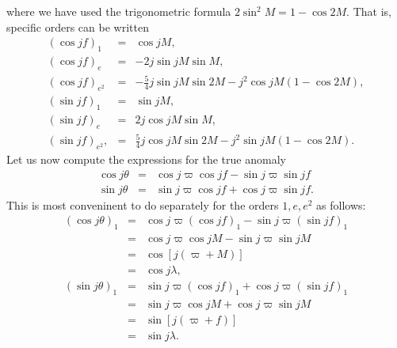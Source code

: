 \documentclass [12pt, a4paper] {article}
\begin{document}
where we have used the trigonometric formula $2\sin^2 M = 1 - \cos 2M$.
That is, specific orders can be written 
\begin {eqnarray}
    (\cos jf)_1\;
    &=& 
    \cos jM,
    \\    
    (\cos jf)_e\;
    &=& 
    -2j\sin jM\sin M,
    \\
    (\cos jf)_{e^2} 
    &=&
    -\frac{5}{4}j\sin jM\sin 2M - j^2\cos jM(1 - \cos 2M),
    \\
    (\sin jf)_1\;
    &=& 
    \sin jM,
    \\
    (\sin jf)_e\;
    &=& 
    2j\cos jM\sin M,
    \\
    (\sin jf)_{e^2},
    &=& 
    \frac{5}{4}j\cos jM\sin 2M 
    -
    j^2\sin jM 
    \left(
        1 - \cos 2M
    \right).
\end {eqnarray}
Let us now compute the expressions for the true anomaly 
\begin {eqnarray}
    \cos j\theta 
    &=& 
    \cos j\varpi\cos jf - \sin j\varpi\sin jf 
    \\
    \sin j\theta 
    &=& 
    \sin j\varpi\cos jf + \cos j\varpi\sin jf.
\end {eqnarray}
This is most conveninent to do separately for the orders $1, e, e^2$ as follows:
\begin {eqnarray}
    (\cos j\theta)_1
    &=& 
    \cos j\varpi(\cos jf)_1 - \sin j\varpi(\sin jf)_1
    \\
    &=&
    \cos j\varpi\cos jM - \sin j\varpi\sin jM
    \\
    &=& 
    \cos [j(\varpi + M)]
    \\
    &=& 
    \cos j\lambda,
    \\
    (\sin j\theta)_1 
    &=& 
    \sin j\varpi(\cos jf)_1 + \cos j\varpi(\sin jf)_1
    \\
    &=& 
    \sin j\varpi\cos jM + \cos j\varpi\sin jM 
    \\
    &=& 
    \sin [j(\varpi + f)]
    \\
    &=& 
    \sin j\lambda.
\end {eqnarray}
\end{document}
